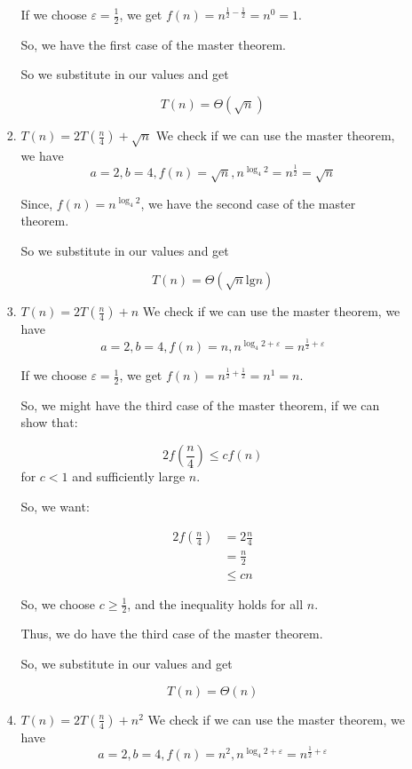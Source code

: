 \documentclass[12pt,letterpaper]{article}
\newcommand{\lb}[0]{\text{lg}}
\begin{document}
\begin{enumerate}
\begin{enumerate}
\begin{enumerate}
              If we choose $\varepsilon = \frac{1}{2}$, we get $f(n) = n^{\frac{1}{2} - \frac{1}{2}} = n^0 = 1$.

              So, we have the first case of the master theorem.

              So we substitute in our values and get

              \[T(n) = \Theta(\sqrt{n})\]
            \item $T(n) = 2T\left(\frac{n}{4}\right) + \sqrt{n}$
              We check if we can use the master theorem, we have
              \[a = 2, b = 4, f(n) = \sqrt{n}, n^{\log_4{2}} = n ^{\frac{1}{2}} = \sqrt{n}\]

              Since, $f(n) = n^{\log_4{2}}$, we have the second case of the master theorem.

              So we substitute in our values and get

              \[T(n) = \Theta(\sqrt{n}\lb{n})\]
            \item $T(n) = 2T\left(\frac{n}{4}\right) + n$
              We check if we can use the master theorem, we have
              \[a = 2, b = 4, f(n) = n, n^{\log_4{2} + \varepsilon} = n ^{\frac{1}{2} + \varepsilon}\]

              If we choose $\varepsilon = \frac{1}{2}$, we get $f(n) = n^{\frac{1}{2} + \frac{1}{2}} = n^1 = n$.

              So, we might have the third case of the master theorem, if we can show that:

              \[2f\left(\frac{n}{4}\right) \le cf(n)\]
              for $c < 1$ and sufficiently large $n$.

              So, we want:

              \begin{align*}
                2f\left(\frac{n}{4}\right) &= 2\frac{n}{4} \\
                &= \frac{n}{2} \\
                &\le cn
              \end{align*}

              So, we choose $c \ge \frac{1}{2}$, and the inequality holds for all $n$.

              Thus, we do have the third case of the master theorem.

              So, we substitute in our values and get

              \[T(n) = \Theta(n)\]
            \item $T(n) = 2T\left(\frac{n}{4}\right) + n^2$
              We check if we can use the master theorem, we have
              \[a = 2, b = 4, f(n) = n^2, n^{\log_4{2} + \varepsilon} = n ^{\frac{1}{2} + \varepsilon}\]


\end{enumerate}
\end{enumerate}
\end{enumerate}
\end{document}

